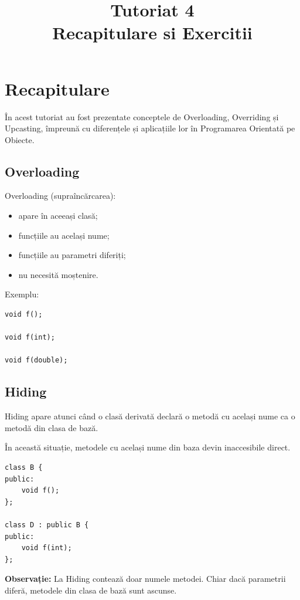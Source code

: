 \documentclass[12pt,a4paper]{article}
\title{Tutoriat 4\\Recapitulare si Exercitii}
\author{}
\date{}
\begin{document}
\maketitle



\section{Recapitulare}

În acest tutoriat au fost prezentate conceptele de Overloading, Overriding și Upcasting, împreună cu diferențele și aplicațiile lor în Programarea Orientată pe Obiecte.

\subsection{Overloading}

Overloading (supraîncărcarea):

\begin{itemize}
\item apare în aceeași clasă;
\item funcțiile au același nume;
\item funcțiile au parametri diferiți;
\item nu necesită moștenire.
\end{itemize}

Exemplu:

\begin{verbatim}
void f();

void f(int);

void f(double);
\end{verbatim}

\subsection{Hiding}

Hiding apare atunci când o clasă derivată declară o metodă cu același nume ca o metodă din clasa de bază.

În această situație, metodele cu același nume din baza devin inaccesibile direct.

\begin{verbatim}
class B {
public:
    void f();
};

class D : public B {
public:
    void f(int);
};
\end{verbatim}

\textbf{Observație:} La Hiding contează doar numele metodei. Chiar dacă parametrii diferă, metodele din clasa de bază sunt ascunse.
\end{document}
